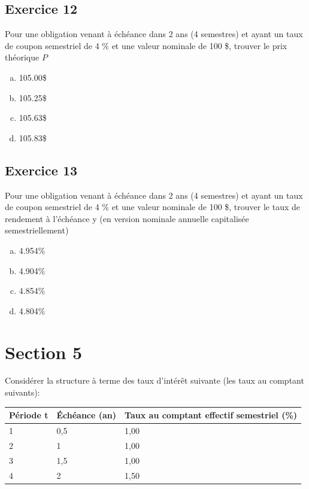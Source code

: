 \documentclass[10pt,a4paper]{article}
\begin{document}
\subsection*{Exercice 12}
Pour une obligation venant à échéance dans 2 ans (4 semestres) et ayant un taux de coupon semestriel de 4 \% et une valeur nominale de 100 \$,  trouver le prix théorique $P$

\begin{enumerate}[a)]
\item 105.00\$
\item 105.25\$
\item 105.63\$
\item 105.83\$
\end{enumerate}


\subsection*{Exercice 13}
Pour une obligation venant à échéance dans 2 ans (4 semestres) et ayant un taux de coupon semestriel de 4 \% et une valeur nominale de 100 \$,  trouver le taux de rendement à l'échéance y (en version nominale annuelle capitalisée semestriellement)

\begin{enumerate}[a)]
\item 4.954\%
\item 4.904\%
\item 4.854\%
\item 4.804\%
\end{enumerate}

\newpage

\section*{Section 5}
Considérer la structure à terme des taux d'intérêt suivante (les taux au comptant suivants): 

\begin{table}[H]
\begin{center}
\begin{tabular}{|l|l|l|}
\hline
Période t & Échéance (an) & Taux au comptant effectif semestriel (\%) \\ \hline
1         & 0,5           & 1,00                                      \\ \hline
2         & 1             & 1,00                                      \\ \hline
3         & 1,5           & 1,00                                      \\ \hline
4         & 2             & 1,50                                      \\ \hline
\end{tabular}
\end{center}
\end{table}
\end{document}
